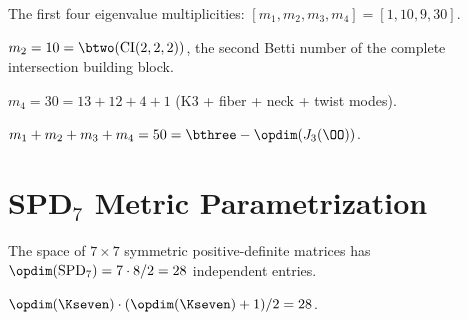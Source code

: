 \begin{definition}\label{def:spectral_mult}
    \leanok
    The first four eigenvalue multiplicities:
    $[m_1, m_2, m_3, m_4] = [1, 10, 9, 30]$.
\end{definition}

\begin{theorem}[Topological Origin of $m_2 = 10$]\label{thm:mult2_CI222}
    \leanok
    $m_2 = 10 = \btwo(\mathrm{CI}(2,2,2))$, the second Betti number
    of the complete intersection building block.
\end{theorem}

\begin{theorem}[Mode Decomposition of $m_4 = 30$]\label{thm:mult4_decomp}
    \leanok
    $m_4 = 30 = 13 + 12 + 4 + 1$ (K3 + fiber + neck + twist modes).
\end{theorem}

\begin{theorem}\label{thm:total_modes}
    \leanok
    $m_1 + m_2 + m_3 + m_4 = 50 = \bthree - \opdim(J_3(\OO))$.
\end{theorem}

\section{\texorpdfstring{SPD$_7$}{SPD7} Metric Parametrization}

\begin{definition}\label{def:spd7}
    \leanok
    The space of $7 \times 7$ symmetric positive-definite matrices has
    $\opdim(\mathrm{SPD}_7) = 7 \cdot 8/2 = 28$ independent entries.
\end{definition}

\begin{theorem}\label{thm:spd7_formula}
    \leanok
    $\opdim(\Kseven) \cdot (\opdim(\Kseven) + 1) / 2 = 28$.
\end{theorem}

